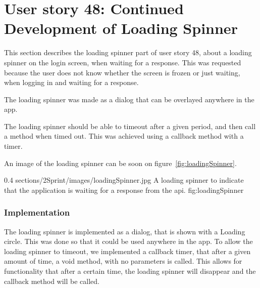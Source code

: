 \section{User story 48: Continued Development of Loading Spinner}
This section describes the loading spinner part of user story 48, about a loading spinner on the login screen, when waiting for a response. This was requested because the user does not know whether the screen is frozen or just waiting, when logging in and waiting for a response. 
 
The loading spinner was made as a dialog that can be overlayed anywhere in the app.
 
The loading spinner should be able to timeout after a given period, and then call a method when timed out. This was achieved using a callback method with a timer. 

An image of the loading spinner can be soon on figure~\ref{fig:loadingSpinner}.

        {0.4} %
        {sections/2Sprint/images/loadingSpinner.jpg} %
        {A loading spinner to indicate that the application is waiting for a response from the api.} %
        {fig:loadingSpinner} %

\subsubsection{Implementation}
The loading spinner is implemented as a dialog, that is shown with a Loading circle. This was done so that it could be used anywhere in the app. To allow the loading spinner to timeout, we implemented a callback timer, that after a given amount of time, a void method, with no parameters is called. This allows for functionality that after a certain time, the loading spinner will disappear and the callback method will be called.
